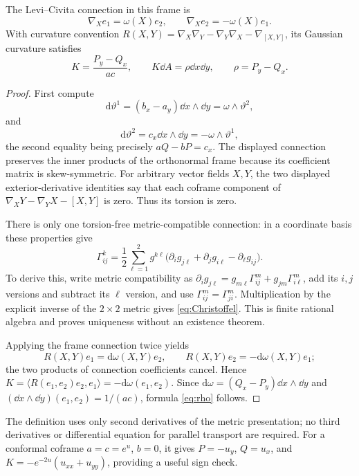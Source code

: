 \begin{lemma}\label{lem:curvature}
The Levi--Civita connection in this frame is
\[
\nabla_Xe_1=\omega(X)e_2,\qquad
\nabla_Xe_2=-\omega(X)e_1.
\]
With curvature convention
$R(X,Y)=\nabla_X\nabla_Y-\nabla_Y\nabla_X-\nabla_{[X,Y]}$,
its Gaussian curvature satisfies
\begin{equation}\label{eq:rho}
K=\frac{P_y-Q_x}{ac},\qquad
K\dd A=\rho\dd x\dd y,\qquad \rho=P_y-Q_x.
\end{equation}
\end{lemma}
\begin{proof}
First compute
\[
\mathrm d\vartheta^1=(b_x-a_y)\dd x\wedge\dd y
=\omega\wedge\vartheta^2,
\]
and
\[
\mathrm d\vartheta^2=c_x\dd x\wedge\dd y
=-\omega\wedge\vartheta^1,
\]
the second equality being precisely $aQ-bP=c_x$. The displayed connection preserves the inner products of the orthonormal frame because its coefficient matrix is skew-symmetric. For arbitrary vector fields $X,Y$, the two displayed exterior-derivative identities say that each coframe component of
$\nabla_XY-\nabla_YX-[X,Y]$ is zero. Thus its torsion is zero.

There is only one torsion-free metric-compatible connection: in a coordinate basis these properties give
\begin{equation}\label{eq:Christoffel}
\Gamma^k_{ij}=
\frac12\sum_{\ell=1}^2 g^{k\ell}
\bigl(\partial_i g_{j\ell}+\partial_jg_{i\ell}-\partial_\ell g_{ij}\bigr).
\end{equation}
To derive this, write metric compatibility as
$\partial_i g_{j\ell}=g_{m\ell}\Gamma^m_{ij}+g_{jm}\Gamma^m_{i\ell}$,
add its $i,j$ versions and subtract its $\ell$ version, and use
$\Gamma^m_{ij}=\Gamma^m_{ji}$. Multiplication by the explicit inverse of the $2\times2$ metric gives \eqref{eq:Christoffel}. This is finite rational algebra and proves uniqueness without an existence theorem.

Applying the frame connection twice yields
\[
R(X,Y)e_1=\mathrm d\omega(X,Y)e_2,\qquad
R(X,Y)e_2=-\mathrm d\omega(X,Y)e_1;
\]
the two products of connection coefficients cancel. Hence
$K=\langle R(e_1,e_2)e_2,e_1\rangle=-\mathrm d\omega(e_1,e_2)$.
Since $\mathrm d\omega=(Q_x-P_y)\dd x\wedge\dd y$ and
$(\dd x\wedge\dd y)(e_1,e_2)=1/(ac)$, formula \eqref{eq:rho} follows.
\end{proof}

The definition uses only second derivatives of the metric presentation; no third derivatives or differential equation for parallel transport are required. For a conformal coframe $a=c=e^u$, $b=0$, it gives $P=-u_y$, $Q=u_x$, and
$K=-e^{-2u}(u_{xx}+u_{yy})$, providing a useful sign check.

